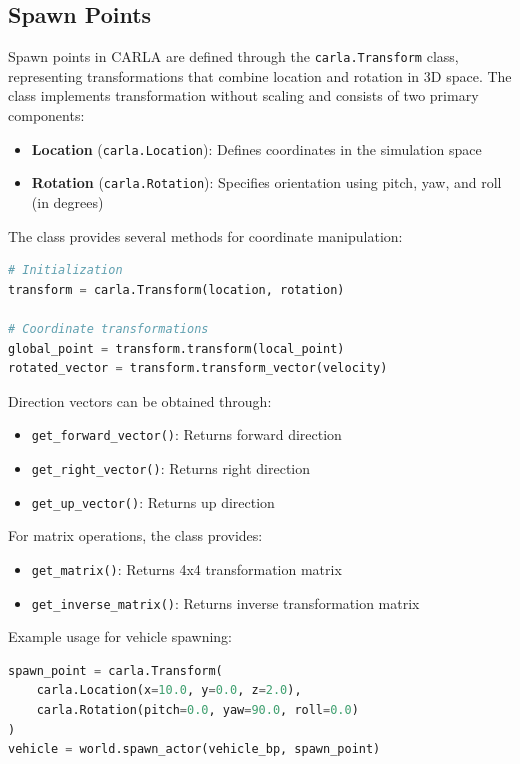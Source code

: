 \subsection{Spawn Points}

Spawn points in CARLA are defined through the \texttt{carla.Transform} class, representing transformations that combine location and rotation in 3D space. The class implements transformation without scaling and consists of two primary components:

\begin{itemize}
    \item \textbf{Location} (\texttt{carla.Location}): Defines coordinates in the simulation space
    \item \textbf{Rotation} (\texttt{carla.Rotation}): Specifies orientation using pitch, yaw, and roll (in degrees)
\end{itemize}

The class provides several methods for coordinate manipulation:

\begin{lstlisting}[language=Python]
# Initialization
transform = carla.Transform(location, rotation)

# Coordinate transformations
global_point = transform.transform(local_point)
rotated_vector = transform.transform_vector(velocity)
\end{lstlisting}

Direction vectors can be obtained through:
\begin{itemize}
    \item \texttt{get\_forward\_vector()}: Returns forward direction
    \item \texttt{get\_right\_vector()}: Returns right direction
    \item \texttt{get\_up\_vector()}: Returns up direction
\end{itemize}

For matrix operations, the class provides:
\begin{itemize}
    \item \texttt{get\_matrix()}: Returns 4x4 transformation matrix
    \item \texttt{get\_inverse\_matrix()}: Returns inverse transformation matrix
\end{itemize}

Example usage for vehicle spawning:
\begin{lstlisting}[language=Python]
spawn_point = carla.Transform(
    carla.Location(x=10.0, y=0.0, z=2.0),
    carla.Rotation(pitch=0.0, yaw=90.0, roll=0.0)
)
vehicle = world.spawn_actor(vehicle_bp, spawn_point)
\end{lstlisting}

